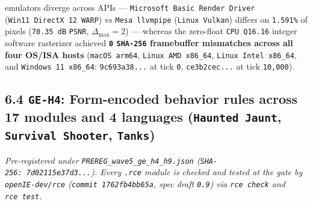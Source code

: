 \documentclass[10pt,letterpaper]{article}
\begin{document}
\begin{itemize}
  emulators diverge across APIs ---
  \texttt{Microsoft\ Basic\ Render\ Driver}
  (\texttt{Win11\ DirectX\ 12\ WARP}) vs \texttt{Mesa\ llvmpipe}
  (\texttt{Linux\ Vulkan}) differs on \texttt{1.591\%} of pixels
  (\texttt{70.35\ dB} \texttt{PSNR}, \(\Delta_{\max} = 2\)) --- whereas
  the zero-float \texttt{CPU\ Q16.\allowbreak{}16} integer software rasterizer
  achieved \textbf{\texttt{0} \texttt{SHA-256} framebuffer mismatches
  across all four OS/ISA hosts} (\texttt{macOS\ arm64},
  \texttt{Linux\ AMD\ x86\_\allowbreak{}64}, \texttt{Linux\ Intel\ x86\_\allowbreak{}64}, and
  \texttt{Windows\ 11\ x86\_\allowbreak{}64}: \texttt{9c693a38.\allowbreak{}.\allowbreak{}.\allowbreak{}} at tick
  \texttt{0}, \texttt{ce3b2cec.\allowbreak{}.\allowbreak{}.\allowbreak{}} at tick \texttt{10,000}).
\end{itemize}

\subsection{\texorpdfstring{6.4 \texttt{GE-H4}: Form-encoded behavior
rules across 17 modules and 4 languages (\texttt{Haunted\ Jaunt},
\texttt{Survival\ Shooter},
\texttt{Tanks})}{6.4 GE-H4: Form-encoded behavior rules across 17 modules and 4 languages (Haunted Jaunt, Survival Shooter, Tanks)}}\label{ge-h4-form-encoded-behavior-rules-across-17-modules-and-4-languages-haunted-jaunt-survival-shooter-tanks}

\emph{Pre-registered under \texttt{PREREG\_\allowbreak{}wave5\_\allowbreak{}ge\_\allowbreak{}h4\_\allowbreak{}h9.\allowbreak{}json}
(\texttt{SHA-\allowbreak{}256:\ 7d02115e37d3.\allowbreak{}.\allowbreak{}.\allowbreak{}}). Every \texttt{.rce} module is
checked and tested at the gate by \texttt{openIE-\allowbreak{}dev/\allowbreak{}rce}
(\texttt{commit\ 1762fb4bb65a}, spec draft \texttt{0.9}) via
\texttt{rce\ check} and \texttt{rce\ test}.}
\end{document}
